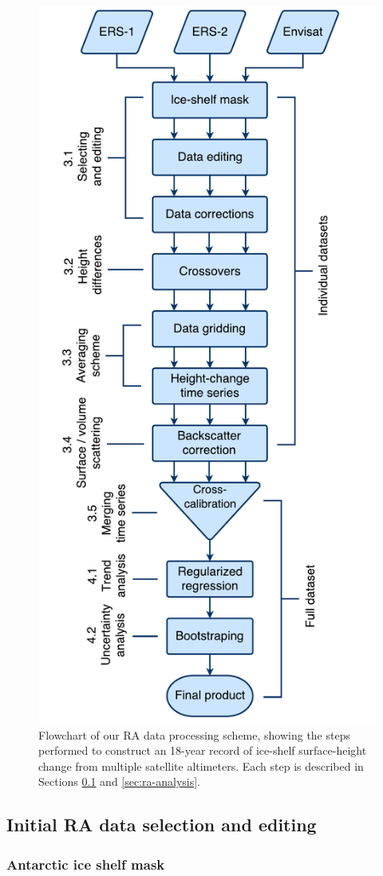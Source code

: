 \begin{figure}[!ht]
  \centering
  \includegraphics[width=.6\textwidth]{img/flowchart_v4.pdf}
  \caption[Flowchart of our RA data processing scheme]{
  \ssp \footnotesize
  Flowchart of our RA data processing scheme, showing the steps performed to construct an 18-year record of ice-shelf surface-height change from multiple satellite altimeters. Each step is described in Sections \ref{sec:ra-processing} and \ref{sec:ra-analysis}.}
  \label{c2f2}
\end{figure}


\subsection{Initial RA data selection and editing}
\label{sec:ra-processing}

\subsubsection{Antarctic ice shelf mask}

